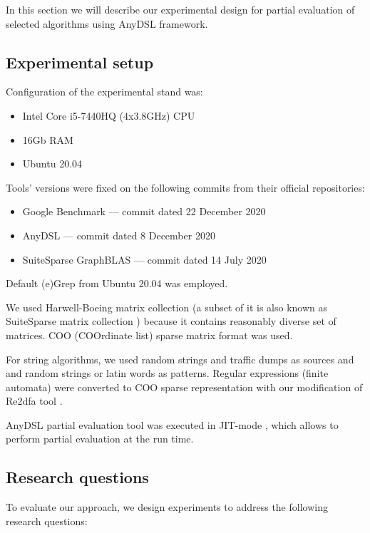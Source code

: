 \documentclass[conference]{IEEEtran}
\begin{document}
In this section we will describe our experimental design for partial evaluation of selected algorithms using AnyDSL framework.

\subsection{Experimental setup}

Configuration of the experimental stand was:
\begin{itemize}
	\item Intel Core i5-7440HQ (4x3.8GHz) CPU
	\item 16Gb RAM
	\item Ubuntu 20.04
\end{itemize}

Tools' versions were fixed on the following commits from their official repositories:
\begin{itemize}
	\item Google Benchmark \cite{gbenchmark} --- commit dated 22 December 2020
	\item AnyDSL \cite{leissa2018anydsl} --- commit dated 8 December 2020
	\item SuiteSparse GraphBLAS \colorbox{red}{\cite{moreira2018implementing}} --- commit dated 14 July 2020
\end{itemize}

Default (e)Grep from Ubuntu 20.04 was employed.

We used Harwell-Boeing matrix collection \cite{duff1992users} (a subset of it is also known as SuiteSparse matrix collection \cite{davis2011university}) because it contains reasonably diverse set of matrices. COO (COOrdinate list) sparse matrix format was used.

For string algorithms, we used random strings and traffic dumps as sources and and random strings or latin words as patterns. Regular expressions (finite automata) were converted to COO sparse representation with our modification of Re2dfa tool \cite{re2dfa}.

AnyDSL partial evaluation tool was executed in JIT-mode \colorbox{red}{\cite{leissa2018anydsl}}, which allows to perform partial evaluation at the run time.



\subsection{Research questions}

To evaluate our approach, we design experiments to address the following research questions:
\end{document}
